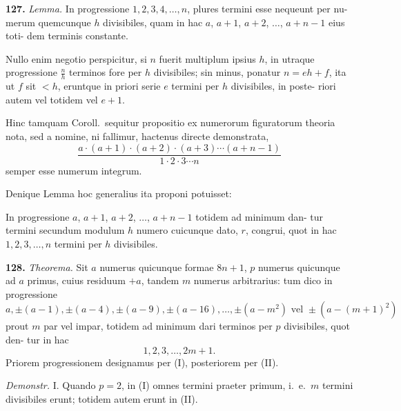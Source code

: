 \documentclass[12pt,a4paper]{article}
\begin{document}
\textbf{127.}
\textit{Lemma.} In progressione $1, 2, 3, 4, \ldots, n$, plures termini esse nequeunt per nu-
merum quemcunque $h$ divisibiles, quam in hac $a$, $a+1$, $a+2$, $\ldots$, $a+n-1$ eius toti-
dem terminis constante.

Nullo enim negotio perspicitur, si $n$ fuerit multiplum ipsius $h$, in utraque
progressione $\frac{n}{h}$ terminos fore per $h$ divisibiles; sin minus, ponatur $n = eh+f$,
ita ut $f$ sit $< h$, eruntque in priori serie $e$ termini per $h$ divisibiles, in poste-
riori autem vel totidem vel $e+1$.

Hinc tamquam Coroll.\ sequitur propositio ex numerorum figuratorum theoria
nota, sed a nomine, ni fallimur, hactenus directe demonstrata,
\[
\frac{a \cdot (a+1) \cdot (a+2) \cdot (a+3) \cdots (a+n-1)}{1 \cdot 2 \cdot 3 \cdots n}
\]
semper esse numerum integrum.

Denique Lemma hoc generalius ita proponi potuisset:

In progressione $a$, $a+1$, $a+2$, $\ldots$, $a+n-1$ totidem ad minimum dan-
tur termini secundum modulum $h$ numero cuicunque dato, $r$, congrui, quot in
hac $1, 2, 3, \ldots, n$ termini per $h$ divisibiles.


\textbf{128.}
\textit{Theorema.} Sit $a$ numerus quicunque formae $8n+1$, $p$ numerus quicunque
ad $a$ primus, cuius residuum $+a$, tandem $m$ numerus arbitrarius: tum dico in
progressione
\[
a, \pm(a-1), \pm(a-4), \pm(a-9), \pm(a-16), \ldots, \pm(a-m^2) \text{ vel } \pm(a-(m+1)^2)
\]
prout $m$ par vel impar, totidem ad minimum dari terminos per $p$ divisibiles, quot den-
tur in hac
\[
1, 2, 3, \ldots, 2m+1.
\]
Priorem progressionem designamus per (I), posteriorem per (II).

\textit{Demonstr.} I. Quando $p = 2$, in (I) omnes termini praeter primum, i.~e.\ $m$
termini divisibiles erunt; totidem autem erunt in (II).
\end{document}

